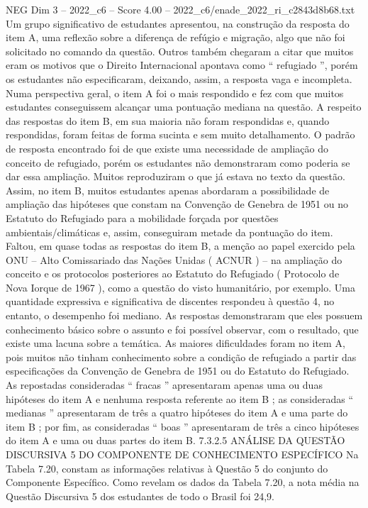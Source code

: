 \begin{textsample}{NEG Dim 3 – 2022\_c6 – Score 4.00 – 2022\_c6/enade\_2022\_ri\_c2843d8b68.txt}
Um grupo significativo de estudantes apresentou, na construção da resposta do item A, uma reflexão sobre a diferença de refúgio e migração, algo que não foi solicitado no comando da questão.
Outros também chegaram a citar que muitos eram os motivos que o Direito Internacional apontava como “ refugiado ”, porém os estudantes não especificaram, deixando, assim, a resposta vaga e incompleta.
Numa perspectiva geral, o item A foi o mais respondido e fez com que muitos estudantes conseguissem alcançar uma pontuação mediana na questão.
A respeito das respostas do item B, em sua maioria não foram respondidas e, quando respondidas, foram feitas de forma sucinta e sem muito detalhamento.
O padrão de resposta encontrado foi de que existe uma necessidade de ampliação do conceito de refugiado, porém os estudantes não demonstraram como poderia se dar essa ampliação.
Muitos reproduziram o que já estava no texto da questão.
Assim, no item B, muitos estudantes apenas abordaram a possibilidade de ampliação das hipóteses que constam na Convenção de Genebra de 1951 ou no Estatuto do Refugiado para a mobilidade forçada por questões ambientais/climáticas e, assim, conseguiram metade da pontuação do item.
Faltou, em quase todas as respostas do item B, a menção ao papel exercido pela ONU – Alto Comissariado das Nações Unidas ( ACNUR ) – na ampliação do conceito e os protocolos posteriores ao Estatuto do Refugiado ( Protocolo de Nova Iorque de 1967 ), como a questão do visto humanitário, por exemplo.
Uma quantidade expressiva e significativa de discentes respondeu à questão 4, no entanto, o desempenho foi mediano.
As respostas demonstraram que eles possuem conhecimento básico sobre o assunto e foi possível observar, com o resultado, que existe uma lacuna sobre a temática.
As maiores dificuldades foram no item A, pois muitos não tinham conhecimento sobre a condição de refugiado a partir das especificações da Convenção de Genebra de 1951 ou do Estatuto do Refugiado.
As repostadas consideradas “ fracas ” apresentaram apenas uma ou duas hipóteses do item A e nenhuma resposta referente ao item B ; as consideradas “ medianas ” apresentaram de três a quatro hipóteses do item A e uma parte do item B ; por fim, as consideradas “ boas ” apresentaram de três a cinco hipóteses do item A e uma ou duas partes do item B. 7.3.2.5 ANÁLISE DA QUESTÃO DISCURSIVA 5 DO COMPONENTE DE CONHECIMENTO ESPECÍFICO Na Tabela 7.20, constam as informações relativas à Questão 5 do conjunto do Componente Específico.
Como revelam os dados da Tabela 7.20, a nota média na Questão Discursiva 5 dos estudantes de todo o Brasil foi 24,9.

\end{textsample}
